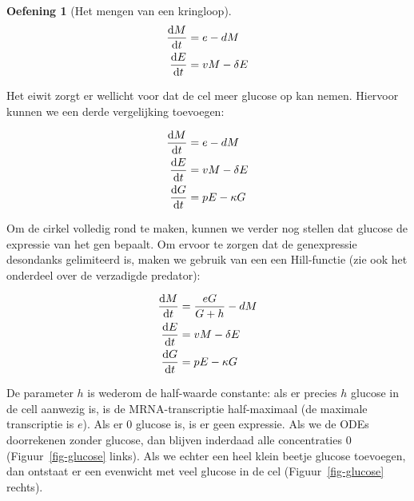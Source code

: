 \documentclass[
  a4paper,
]{scrbook}
\theoremstyle{definition}
\newtheorem{exercise}{Oefening}[chapter]
\theoremstyle{remark}
\begin{document}
\begin{exercise}[Het mengen van een
kringloop]
\begin{align*}
    \mathchoice{\frac{\mathrm{d}M}
{\mathrm{d}t}}{\mathrm{d}M/\mathrm{d}t}
{\mathrm{d}M/\mathrm{d}t}
{\mathrm{d}M/\mathrm{d}t} &= e - dM \\
    \mathchoice{\frac{\mathrm{d}E}
{\mathrm{d}t}}{\mathrm{d}E/\mathrm{d}t}
{\mathrm{d}E/\mathrm{d}t}
{\mathrm{d}E/\mathrm{d}t} &= vM - \delta E
\end{align*}

Het eiwit zorgt er wellicht voor dat de cel meer glucose op kan nemen.
Hiervoor kunnen we een derde vergelijking toevoegen:

\begin{align*}
    \mathchoice{\frac{\mathrm{d}M}
{\mathrm{d}t}}{\mathrm{d}M/\mathrm{d}t}
{\mathrm{d}M/\mathrm{d}t}
{\mathrm{d}M/\mathrm{d}t} &= e - dM \\
    \mathchoice{\frac{\mathrm{d}E}
{\mathrm{d}t}}{\mathrm{d}E/\mathrm{d}t}
{\mathrm{d}E/\mathrm{d}t}
{\mathrm{d}E/\mathrm{d}t} &= vM - \delta E\\
    \mathchoice{\frac{\mathrm{d}G}
{\mathrm{d}t}}{\mathrm{d}G/\mathrm{d}t}
{\mathrm{d}G/\mathrm{d}t}
{\mathrm{d}G/\mathrm{d}t} &= pE - \kappa G\\
\end{align*}

Om de cirkel volledig rond te maken, kunnen we verder nog stellen dat
glucose de expressie van het gen bepaalt. Om ervoor te zorgen dat de
genexpressie desondanks gelimiteerd is, maken we gebruik van een een
Hill-functie (zie ook het onderdeel over de verzadigde predator):

\begin{align*}
    \mathchoice{\frac{\mathrm{d}M}
{\mathrm{d}t}}{\mathrm{d}M/\mathrm{d}t}
{\mathrm{d}M/\mathrm{d}t}
{\mathrm{d}M/\mathrm{d}t} &= \frac{eG}{G+h} - dM \\
    \mathchoice{\frac{\mathrm{d}E}
{\mathrm{d}t}}{\mathrm{d}E/\mathrm{d}t}
{\mathrm{d}E/\mathrm{d}t}
{\mathrm{d}E/\mathrm{d}t} &= vM - \delta E\\
    \mathchoice{\frac{\mathrm{d}G}
{\mathrm{d}t}}{\mathrm{d}G/\mathrm{d}t}
{\mathrm{d}G/\mathrm{d}t}
{\mathrm{d}G/\mathrm{d}t} &= pE - \kappa G\\
\end{align*}

De parameter \(h\) is wederom de half-waarde constante: als er precies
\(h\) glucose in de cell aanwezig is, is de MRNA-transcriptie
half-maximaal (de maximale transcriptie is \(e\)). Als er 0 glucose is,
is er geen expressie. Als we de ODEs doorrekenen zonder glucose, dan
blijven inderdaad alle concentraties 0 (Figuur~\ref{fig-glucose} links).
Als we echter een heel klein beetje glucose toevoegen, dan ontstaat er
een evenwicht met veel glucose in de cel (Figuur~\ref{fig-glucose}
rechts).


\end{exercise}
\end{document}
